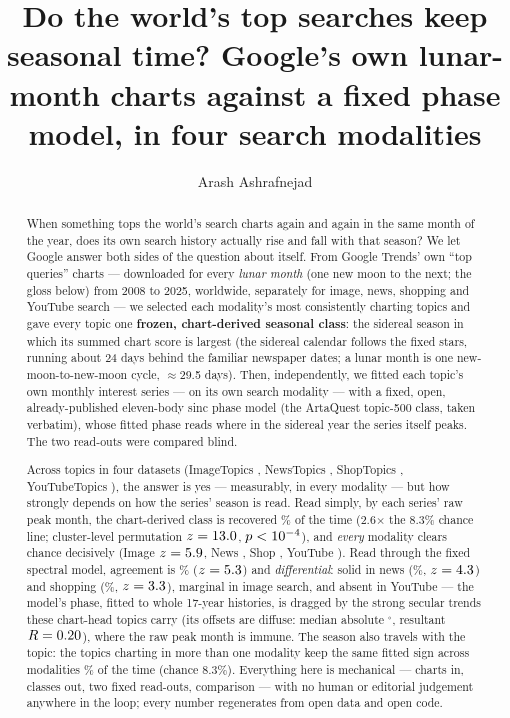 \documentclass[11pt]{artaquest}
\title{Do the world's top searches keep seasonal time? Google's own lunar-month charts against a fixed phase model, in four search modalities}
\author{Arash Ashrafnejad\affmark{1}}
\affiliation{\affmark{1}ArtaQuest Foundation}
\begin{document}
\maketitle

\begin{abstract}
When something tops the world's search charts again and again in the same month of the year, does its own search history actually rise and fall with that season? We let Google answer both sides of the question about itself. From Google Trends' own ``top queries'' charts --- downloaded for every \emph{lunar month} (one new moon to the next; the gloss below) from 2008 to 2025, worldwide, separately for image, news, shopping and YouTube search --- we selected each modality's most consistently charting topics and gave every topic one \textbf{frozen, chart-derived seasonal class}: the sidereal season in which its summed chart score is largest (the sidereal calendar follows the fixed stars, running about 24 days behind the familiar newspaper dates; a lunar month is one new-moon-to-new-moon cycle, $\approx$29.5 days). Then, independently, we fitted each topic's own monthly interest series --- on its own search modality --- with a fixed, open, already-published eleven-body sinc phase model (the ArtaQuest topic-500 class, taken verbatim), whose fitted phase reads where in the sidereal year the series itself peaks. The two read-outs were compared blind.

Across \nTotal{} topics in four datasets (ImageTopics \nImage{}, NewsTopics \nNews{}, ShopTopics \nShop{}, YouTubeTopics \nYouTube{}), the answer is yes --- measurably, in every modality --- but how strongly depends on how the series' season is read. Read simply, by each series' raw peak month, the chart-derived class is recovered \rawAgree\% of the time (2.6$\times$ the $8.3\%$ chance line; cluster-level permutation $z = 13.0$, $p < 10^{-4}$), and \emph{every} modality clears chance decisively (Image $z = 5.9$, News \rawZNews, Shop \rawZShop, YouTube \rawZYouTube). Read through the fixed spectral model, agreement is \poolAgree\% ($z = 5.3$) and \emph{differential}: solid in news (\agreeNews\%, $z=4.3$) and shopping (\agreeShop\%, $z=3.3$), marginal in image search, and absent in YouTube --- the model's phase, fitted to whole 17-year histories, is dragged by the strong secular trends these chart-head topics carry (its offsets are diffuse: median absolute \poolMedAbs$^\circ$, resultant $R = 0.20$), where the raw peak month is immune. The season also travels with the topic: the \xTopics{} topics charting in more than one modality keep the same fitted sign across modalities \xSame\% of the time (chance $8.3\%$). Everything here is mechanical --- charts in, classes out, two fixed read-outs, comparison --- with no human or editorial judgement anywhere in the loop; every number regenerates from open data and open code.
\end{abstract}
\end{document}
